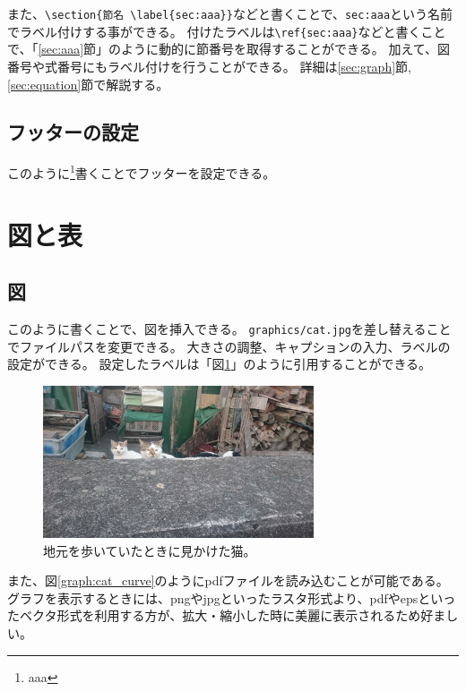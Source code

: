 \documentclass[uplatex, a4paper,twocolumn, 14pt]{jsarticle}
\begin{document}
また、\verb|\section{節名 \label{sec:aaa}}|などと書くことで、\verb|sec:aaa|という名前でラベル付けする事ができる。
付けたラベルは\verb|\ref{sec:aaa}|などと書くことで、「\ref{sec:aaa}節」のように動的に節番号を取得することができる。
加えて、図番号や式番号にもラベル付けを行うことができる。
詳細は\ref{sec:graph}節, \ref{sec:equation}節で解説する。

\subsection{フッターの設定}
このように\footnote{aaa}書くことでフッターを設定できる。


\section{図と表}

\subsection{図 \label{sec:graph}}

このように書くことで、図を挿入できる。
\verb|graphics/cat.jpg|を差し替えることでファイルパスを変更できる。
大きさの調整、キャプションの入力、ラベルの設定ができる。
設定したラベルは「図\ref{graph:cat}」のように引用することができる。

\begin{figure}[tbh]
    \begin{center}
        \includegraphics[width=8cm]{graphics/cat.jpg}
        \caption{
            地元を歩いていたときに見かけた猫。
        }
        \label{graph:cat}
    \end{center}
\end{figure}

また、図\ref{graph:cat_curve}のようにpdfファイルを読み込むことが可能である。
グラフを表示するときには、pngやjpgといったラスタ形式より、pdfやepsといったベクタ形式を利用する方が、拡大・縮小した時に美麗に表示されるため好ましい。
\end{document}
